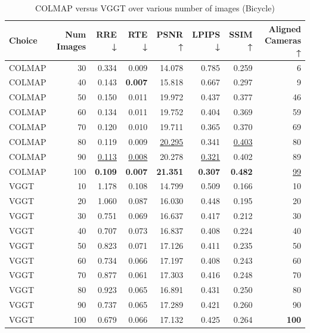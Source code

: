 \begin{table}[H]
\caption{\ifdefined\customcaption \customcaption \else COLMAP versus VGGT over various number of images (Bicycle) \fi}
\label{tab:01_num_images_brief_bicycle}
\centering
\scriptsize
\begin{tabular}{lrrrrrrr}
\toprule
Choice & Num Images & RRE ↓ & RTE ↓ & PSNR ↑ & LPIPS ↓ & SSIM ↑ & Aligned Cameras ↑ \\
\midrule
COLMAP & 30 & 0.334 & 0.009 & 14.078 & 0.785 & 0.259 & 6 \\
COLMAP & 40 & 0.143 & \textbf{0.007} & 15.818 & 0.667 & 0.297 & 9 \\
COLMAP & 50 & 0.150 & 0.011 & 19.972 & 0.437 & 0.377 & 46 \\
COLMAP & 60 & 0.134 & 0.011 & 19.752 & 0.404 & 0.369 & 59 \\
COLMAP & 70 & 0.120 & 0.010 & 19.711 & 0.365 & 0.370 & 69 \\
COLMAP & 80 & 0.119 & 0.009 & \underline{20.295} & 0.341 & \underline{0.403} & 80 \\
COLMAP & 90 & \underline{0.113} & \underline{0.008} & 20.278 & \underline{0.321} & 0.402 & 89 \\
COLMAP & 100 & \textbf{0.109} & \textbf{0.007} & \textbf{21.351} & \textbf{0.307} & \textbf{0.482} & \underline{99} \\
VGGT & 10 & 1.178 & 0.108 & 14.799 & 0.509 & 0.166 & 10 \\
VGGT & 20 & 1.060 & 0.087 & 16.030 & 0.448 & 0.195 & 20 \\
VGGT & 30 & 0.751 & 0.069 & 16.637 & 0.417 & 0.212 & 30 \\
VGGT & 40 & 0.707 & 0.073 & 16.837 & 0.408 & 0.224 & 40 \\
VGGT & 50 & 0.823 & 0.071 & 17.126 & 0.411 & 0.235 & 50 \\
VGGT & 60 & 0.734 & 0.066 & 17.197 & 0.408 & 0.243 & 60 \\
VGGT & 70 & 0.877 & 0.061 & 17.303 & 0.416 & 0.248 & 70 \\
VGGT & 80 & 0.923 & 0.065 & 16.891 & 0.431 & 0.250 & 80 \\
VGGT & 90 & 0.737 & 0.065 & 17.289 & 0.421 & 0.260 & 90 \\
VGGT & 100 & 0.679 & 0.066 & 17.132 & 0.425 & 0.264 & \textbf{100} \\
\bottomrule
\end{tabular}
\end{table}